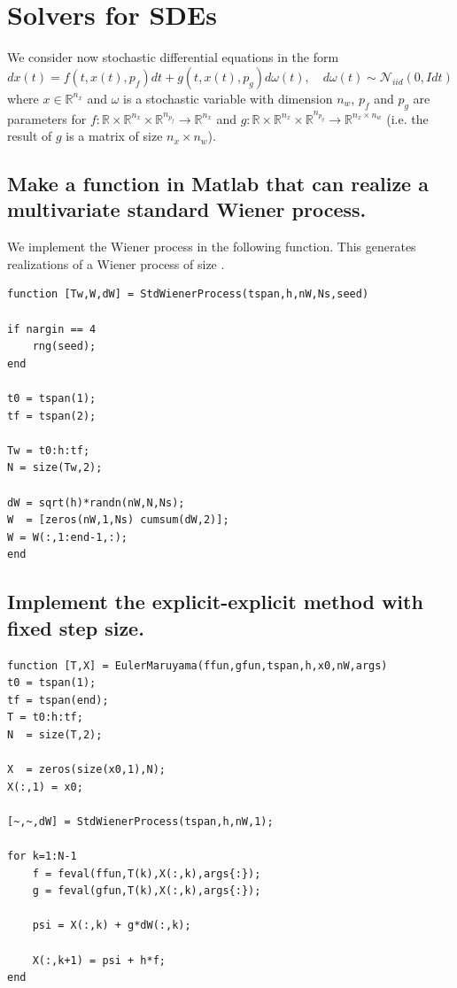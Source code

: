 \section{Solvers for SDEs}
We consider now stochastic differential equations in the form
\begin{equation} \label{4_problem}
    dx(t) = f(t,x(t),p_f) dt + g(t,x(t),p_g) d\omega (t), \hspace{1em} d \omega (t) \sim \mathcal{N}_{iid}(0, Idt)
\end{equation}
where $x \in \mathbb{R}^{n_x}$ and $\omega$ is a stochastic variable with dimension $n_w$, $p_f$ and $p_g$ are parameters for $f:\mathbb{R} \times \mathbb{R}^{n_x} \times \mathbb{R}^{n_{p_f}} \to \mathbb{R}^{n_x}$ and $g:\mathbb{R} \times \mathbb{R}^{n_x} \times \mathbb{R}^{n_{p_g}} \to \mathbb{R}^{n_x \times n_w}$ (i.e. the result of $g$ is a matrix of size $n_x \times n_w$).

\subsection{Make a function in Matlab that can realize a multivariate standard Wiener process.}
We implement the Wiener process in the following function. This generates  realizations of a Wiener process of size .

\begin{lstlisting}[caption = Multivariate standard Wiener process, captionpos=b, label=4_wiener]
function [Tw,W,dW] = StdWienerProcess(tspan,h,nW,Ns,seed)

if nargin == 4
    rng(seed);
end

t0 = tspan(1);
tf = tspan(2);

Tw = t0:h:tf;
N = size(Tw,2);

dW = sqrt(h)*randn(nW,N,Ns);
W  = [zeros(nW,1,Ns) cumsum(dW,2)];
W = W(:,1:end-1,:);
end

\end{lstlisting}
\subsection{Implement the explicit-explicit method with fixed step size.}
\begin{lstlisting}[caption = Euler-Maruyama Method, captionpos=b, label=4_EulerMaruyama]
function [T,X] = EulerMaruyama(ffun,gfun,tspan,h,x0,nW,args)
t0 = tspan(1);
tf = tspan(end);
T = t0:h:tf;
N  = size(T,2);

X  = zeros(size(x0,1),N);
X(:,1) = x0;

[~,~,dW] = StdWienerProcess(tspan,h,nW,1);

for k=1:N-1
    f = feval(ffun,T(k),X(:,k),args{:});
    g = feval(gfun,T(k),X(:,k),args{:});

    psi = X(:,k) + g*dW(:,k);

    X(:,k+1) = psi + h*f;
end

\end{lstlisting}

